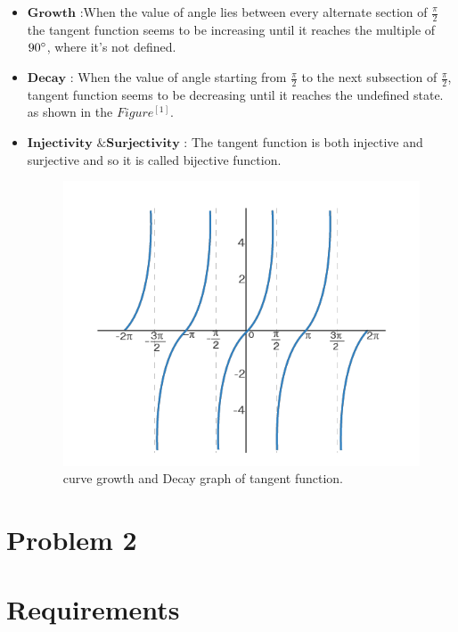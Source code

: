 \documentclass[a4paper, 11pt]{article}
\begin{document}
\begin{itemize}
  \item $\boldsymbol{Growth}$ :When the value of angle lies between every alternate section of $\frac{\pi}{2}$ the tangent function seems to be increasing until it reaches the multiple of $90\degree$, where it's not defined.

  \item $\boldsymbol{Decay}$ : When the value of angle starting from $\frac{\pi}{2}$ to the next subsection of $\frac{\pi}{2}$, tangent function seems to be decreasing until it reaches the undefined state. as shown in the $Figure^{[1]}$.
  
  \item $ \textbf{Injectivity \& Surjectivity}$ : The tangent function is both injective and surjective and so it is  called bijective function.
  
  \begin{figure}[H]
\includegraphics[width=18cm]{TanxGraph.png }
\caption{curve growth and Decay graph of tangent function.}
\label{exp}
\end{figure}
\end{itemize}

\newpage
\section*{Problem 2}
\section*{Requirements}
\end{document}
